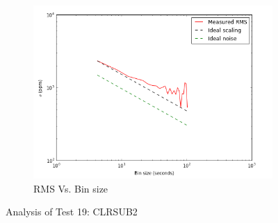 \documentclass{aastex6}
\begin{document}
\begin{figure}[H]
    \begin{subfigure}{3}
        \includegraphics[scale=0.6]{rms_test19}
        \caption{RMS Vs. Bin size}
    \end{subfigure}
    \caption{Analysis of Test 19: CLRSUB2}
\end{figure}
\end{document}
